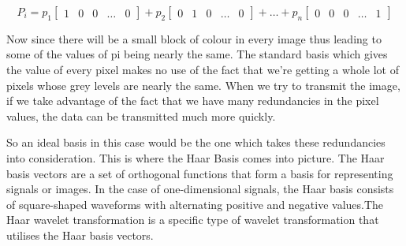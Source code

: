 \documentclass{article}
\begin{document}
\begin{equation*}
    P_i=p_1\begin{bmatrix} 1 & 0 & 0 & \ldots & 0 \end{bmatrix} + p_2\begin{bmatrix} 0 & 1 & 0 & \ldots & 0 \end{bmatrix} + \ldots + p_n\begin{bmatrix} 0 & 0 & 0 & \ldots & 1 \end{bmatrix}
\end{equation*}

\setlength{\parindent}{1cm}
Now since there will be a small block of colour in every image thus leading to some of the values of pi being nearly the same. The standard basis which gives the value of every pixel makes no use of the fact that
we're getting a whole lot of pixels whose grey levels are nearly the same. When we try to transmit the image, if we take advantage of the fact that we have many redundancies in the pixel values, the data can be transmitted much more quickly.

\setlength{\parindent}{1cm}
So an ideal basis in this case would be the one which takes these redundancies into consideration. This is where the Haar Basis comes into picture. The Haar basis vectors are a set of orthogonal functions that form a basis for representing signals or images. In the case of one-dimensional signals, the Haar basis consists of square-shaped waveforms with alternating positive and negative values.The Haar wavelet transformation is a specific type of wavelet transformation that utilises the Haar basis vectors. 
\end{document}
